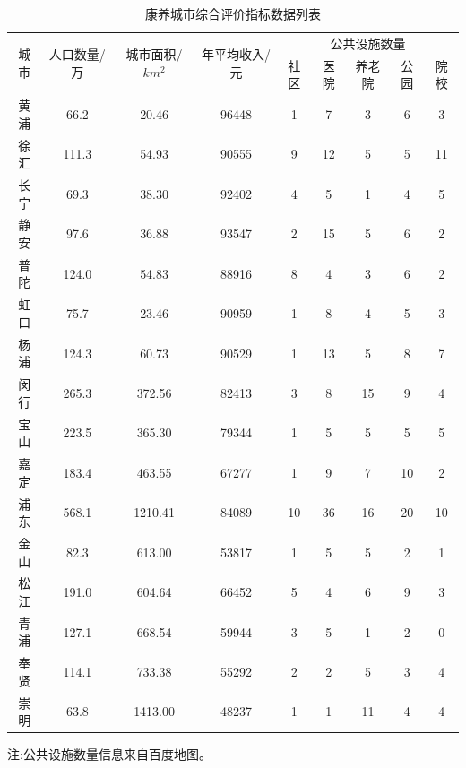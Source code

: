 \documentclass[12pt,a4paper]{article}
\begin{document}
\begin{table}[h]
  \centering
  \caption{康养城市综合评价指标数据列表}
  \begin{adjustbox}{width=\textwidth}
  \begin{tabular}{c|c|c|c|ccccc}
    \toprule[2pt]
    \multirow{2}{*}{城市} & \multirow{2}{*}{人口数量/万} & \multirow{2}{*}{城市面积/$km^2$}& \multirow{2}{*}{年平均收入/元}& \multicolumn{5}{c}{公共设施数量}\\
    \cline{5-9}
    & & & & 社区 & 医院 & 养老院 & 公园 & 院校\\
    \midrule[1pt]
    黄浦 & 66.2 & 20.46 & 96448 & 1 & 7 & 3 & 6 & 3 \\
    徐汇 & 111.3 & 54.93 & 90555 & 9 & 12 & 5 & 5 & 11 \\
    长宁 & 69.3 & 38.30 & 92402 & 4 & 5 & 1 & 4 & 5 \\
    静安 & 97.6 & 36.88 & 93547 & 2 & 15 & 5 & 6 & 2 \\
    普陀 & 124.0 & 54.83 & 88916 & 8 & 4 & 3 & 6 & 2 \\
    虹口 & 75.7 & 23.46 & 90959 & 1 & 8 & 4 & 5 & 3 \\
    杨浦 & 124.3 & 60.73 & 90529 & 1 & 13 & 5 & 8 & 7 \\
    闵行 & 265.3 & 372.56 & 82413 & 3 & 8 & 15 & 9 & 4 \\
    宝山 & 223.5 & 365.30 & 79344 & 1 & 5 & 5 & 5 & 5 \\
    嘉定 & 183.4 & 463.55 & 67277 & 1 & 9 & 7 & 10 & 2 \\
    浦东 & 568.1 & 1210.41 & 84089 & 10 & 36 & 16 & 20 & 10 \\
    金山 & 82.3 & 613.00 & 53817 & 1 & 5 & 5 & 2 & 1 \\
    松江 & 191.0 & 604.64 & 66452 & 5 & 4 & 6 & 9 & 3 \\
    青浦 & 127.1 & 668.54 & 59944 & 3 & 5 & 1 & 2 & 0 \\
    奉贤 & 114.1 & 733.38 & 55292 & 2 & 2 & 5 & 3 & 4 \\
    崇明 & 63.8 & 1413.00 & 48237 & 1 & 1 & 11 & 4 & 4 \\
    \bottomrule[2pt]
  \end{tabular}
  \end{adjustbox}

  \vspace{0.5em}
  {\footnotesize 注:公共设施数量信息来自百度地图。}
\end{table}
\end{document}
